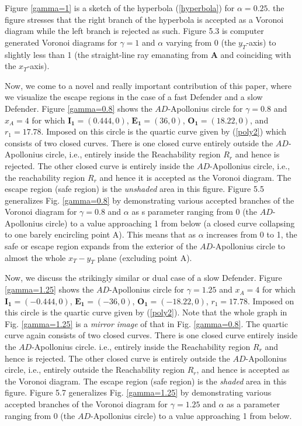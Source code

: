 \documentclass[final,5p,times,twocolumn]{elsarticle}
\begin{document}
Figure \ref{gamma=1} is a sketch of the hyperbola (\ref{hyperbola}) for $\alpha=0.25$. the figure stresses that the right branch of the hyperbola is accepted as a Voronoi diagram while the left branch is rejected as such. Figure 5.3 is computer generated Voronoi diagrams for $\gamma=1$ and $\alpha$ varying from 0 (the $y_T$-axis) to slightly less than 1 (the straight-line ray emanating from $\boldsymbol{A}$ and coinciding with the $x_T$-axis).

Now, we come to a novel and really important contribution of this paper, where we visualize the escape regions in the case of a fast Defender and a slow Defender. Figure \ref{gamma=0.8} shows the $AD$-Apollonius circle for $\gamma=0.8$ and $x_A=4$ for which $\boldsymbol{I_1}=(0.444,0)$, $\boldsymbol{E_1}=(36,0)$, $\boldsymbol{O_1}=(18.22,0)$, and $r_1=17.78$. Imposed on this circle is the quartic curve given by (\ref{poly2}) which consists of two closed curves. There is one closed curve entirely outside the $AD$-Apollonius circle, i.e., entirely inside the Reachability region $R_r$ and hence is rejected. The other closed curve is entirely inside the $AD$-Apollonius circle, i.e., the reachability region $R_r$ and hence it is accepted as the Voronoi diagram. The escape region (safe region) is the \textit{unshaded} area in this figure. Figure 5.5 generalizes Fig. \ref{gamma=0.8} by demonstrating various accepted branches of the Voronoi diagram for $\gamma=0.8$ and $\alpha$ as s parameter ranging from 0 (the $AD$-Apollonius circle) to a value approaching 1 from below (a closed curve collapsing to one barely encircling point A). This means that as $\alpha$ increases from 0 to 1, the safe or escape region expands from the exterior of the $AD$-Apollonius circle to almost the whole $x_T-y_T$ plane (excluding point A).


Now, we discuss the strikingly similar or dual case of a slow Defender. Figure \ref{gamma=1.25} shows the $AD$-Apollonius circle for $\gamma=1.25$ and $x_A=4$ for which $\boldsymbol{I_1}=(-0.444,0)$, $\boldsymbol{E_1}=(-36,0)$, $\boldsymbol{O_1}=(-18.22,0)$, $r_1=17.78$. Imposed on this circle is the quartic curve given by (\ref{poly2}). Note that the whole graph in Fig. \ref{gamma=1.25} is a \textit{mirror image} of that in Fig. \ref{gamma=0.8}. The quartic curve again consists of two closed curves. There is one closed curve entirely inside the $AD$-Apollonius circle. i.e., entirely inside the Reachability region $R_r$ and hence is rejected. The other closed curve is entirely outside the $AD$-Apollonius circle, i.e., entirely outside the Reachability region $R_r$, and hence is accepted as the Voronoi diagram. The escape region (safe region) is the \textit{shaded} area in this figure. Figure 5.7 generalizes Fig. \ref{gamma=1.25} by demonstrating various accepted branches of the Voronoi diagram for $\gamma=1.25$ and $\alpha$ as a parameter ranging from 0 (the $AD$-Apollonius circle) to a value approaching 1 from below.\\ 
    
\end{document}
